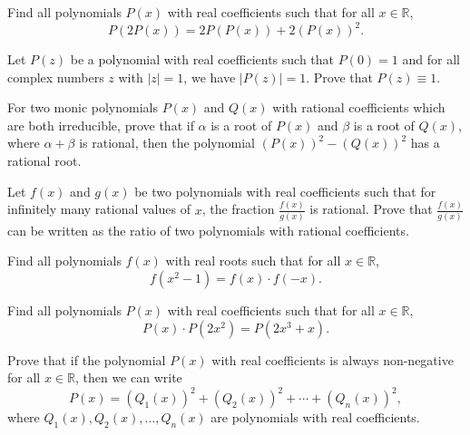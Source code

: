 \documentclass[12pt,a4paper]{memoir}
\theoremstyle{definition}
\begin{document}
\begin{question}[name={2001 Iran Second Round}] 
	Find all polynomials $P(x)$ with real coefficients such that for all $x\in\mathbb R$,
	\[P(2P(x)) = 2P(P(x))+2(P(x))^2.\]
\end{question}




\begin{question}[name={1997 Iran}]
	Let $P(z)$ be a polynomial with real coefficients such that $P(0)=1$ and for all complex numbers $z$ with $|z|=1$, we have $|P(z)|=1$. Prove that $P(z) \equiv 1$.
\end{question}



\begin{question}[name={1997 Iran}]
	For two monic polynomials $P(x)$ and $Q(x)$ with rational coefficients which are both irreducible, prove that if $\alpha$ is a root of $P(x)$ and $\beta$ is a root of $Q(x)$, where $\alpha+\beta$ is rational, then the polynomial $(P(x))^2 - (Q(x))^2$ has a rational root.
\end{question}


\begin{question}[name={1993 Iran Second Round}]
	Let $f(x)$ and $g(x)$ be two polynomials with real coefficients such that for infinitely many rational values of $x$, the fraction $\frac{f(x)}{g(x)}$ is rational. Prove that $\frac{f(x)}{g(x)}$ can be written as the ratio of two polynomials with rational coefficients.
\end{question}

\begin{question}[name={1994 Iran Third Round}]
	Find all polynomials $f(x)$ with real roots such that for all $x\in\mathbb R$,
	\[f(x^2-1)=f(x)\cdot f(-x).\]
\end{question}

\begin{question}[name={1979 Bulgaria}]
	Find all polynomials $P(x)$ with real coefficients such that for all $x \in\mathbb R$,
	\[P(x) \cdot P(2x^2) = P(2x^3+x).\]
\end{question}


\begin{question}[name={1979 Hungary}]
	Prove that if the polynomial $P(x)$ with real coefficients is always non-negative for all $x\in\mathbb R$, then we can write
	\[P(x) = (Q_1(x))^2+(Q_2(x))^2+\cdots+(Q_n(x))^2,\]
	where $Q_1(x), Q_2(x), \dots, Q_n(x)$ are polynomials with real coefficients.
\end{question}
\end{document}
